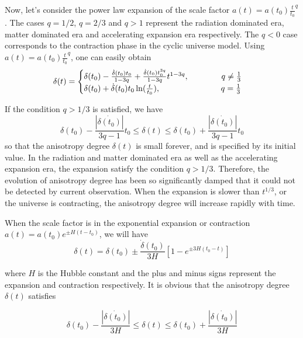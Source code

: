\documentclass[a4paper,preprint]{revtex4}
\begin{document}
Now, let's consider the power law expansion of the scale factor
$a(t)=a(t_0)\frac{t}{t_0}^{q}$. The cases $q=1/2$, $q=2/3$ and
$q>1$ represent the radiation dominated era, matter dominated era
and accelerating expansion era respectively. The $q<0$ case
corresponds to the contraction phase in the cyclic universe model.
Using $a(t)=a(t_0)\frac{t}{t_0}^{q}$, one can easily obtain
\begin{equation}\label{deltaresult}
\delta(t)=
\begin{cases}
\delta(t_0)-\frac{\dot{\delta}(t_0)t_0}{1-3q}+\frac{\dot{\delta}(t_0)t_0^{3q}}{1-3q}t^{1-3q},
\hspace{1.4cm} q\neq \frac{1}{3} \\
\delta(t_0)+\dot{\delta}(t_0)t_0\ln(\frac{t}{t_0}), \hspace{2.6cm}
q=\frac{1}{3}
\end{cases}
\end{equation}

\noindent If the condition $q>1/3$ is satisfied, we have
\begin{equation}\label{condition}
\delta(t_0)-\frac{|\dot{\delta(t_0)}|}{3q-1}t_0\leq \delta(t)\leq
\delta(t_0)+\frac{|\dot{\delta(t_0)}|}{3q-1}t_0
\end{equation}
\noindent so that the anisotropy degree $\delta(t)$ is small
forever, and is specified by its initial value. In the radiation
and matter dominated era as well as the accelerating expansion
era, the expansion satisfy the condition $q>1/3$. Therefore, the
evolution of anisotropy degree has been so significantly damped
that it could not be detected by current observation. When the
expansion is slower than $t^{1/3}$, or the universe is
contracting, the anisotropy degree will increase rapidly with
time.

\noindent When the scale factor is in the exponential expansion or
contraction $a(t)=a(t_0)e^{\pm H(t-t_0)}$, we will have
\begin{equation}\label{exp}
\delta(t)=\delta(t_0)\pm\frac{\dot{\delta}(t_0)}{3H}[1-e^{\pm3H(t_0-t)}]
\end{equation}

\noindent where $H$ is the Hubble constant and the plus and minus
signs represent the expansion and contraction respectively. It is
obvious that the anisotropy degree $\delta(t)$ satisfies

\begin{equation}\label{condition1}
\delta(t_0)-\frac{|\dot{\delta(t_0)}|}{3H}\leq \delta(t)\leq
\delta(t_0)+\frac{|\dot{\delta(t_0)}|}{3H}
\end{equation}
\end{document}
